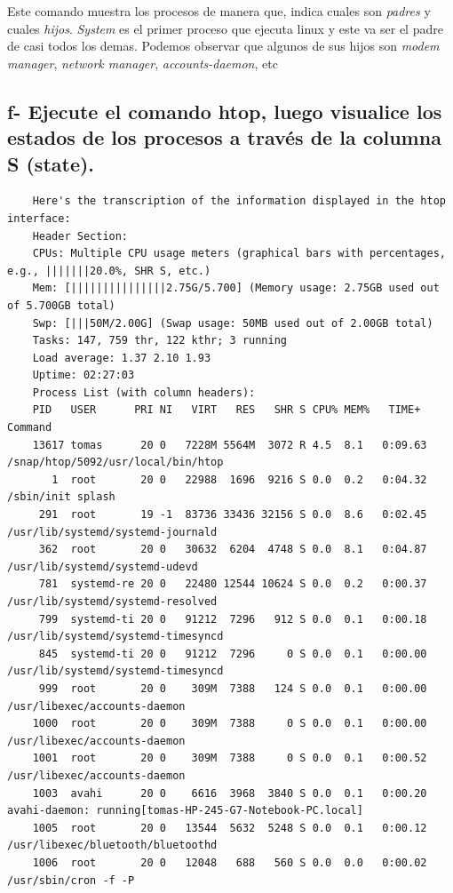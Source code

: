\documentclass{article}
\begin{document}
\noindent
Este comando muestra los procesos de manera que, indica cuales son \textit{padres} y cuales \textit{hijos}.
\textit{System} es el primer proceso que ejecuta linux y este va ser el padre de casi todos los demas.
Podemos observar que algunos de sus hijos son \textit{modem manager}, \textit{network manager}, \textit{accounts-daemon}, etc
\subsection*{f- Ejecute el comando htop, luego visualice los estados de los procesos a través de la columna S (state).}


\begin{commandline}
  {\scriptsize
    \begin{verbatim}
    Here's the transcription of the information displayed in the htop interface:
    Header Section:
    CPUs: Multiple CPU usage meters (graphical bars with percentages, e.g., |||||||20.0%, SHR S, etc.)
    Mem: [|||||||||||||||2.75G/5.700] (Memory usage: 2.75GB used out of 5.700GB total)
    Swp: [|||50M/2.00G] (Swap usage: 50MB used out of 2.00GB total)
    Tasks: 147, 759 thr, 122 kthr; 3 running
    Load average: 1.37 2.10 1.93
    Uptime: 02:27:03
    Process List (with column headers):
    PID   USER      PRI NI   VIRT   RES   SHR S CPU% MEM%   TIME+  Command
    13617 tomas      20 0   7228M 5564M  3072 R 4.5  8.1   0:09.63 /snap/htop/5092/usr/local/bin/htop
       1  root       20 0   22988  1696  9216 S 0.0  0.2   0:04.32 /sbin/init splash
     291  root       19 -1  83736 33436 32156 S 0.0  8.6   0:02.45 /usr/lib/systemd/systemd-journald
     362  root       20 0   30632  6204  4748 S 0.0  8.1   0:04.87 /usr/lib/systemd/systemd-udevd
     781  systemd-re 20 0   22480 12544 10624 S 0.0  0.2   0:00.37 /usr/lib/systemd/systemd-resolved
     799  systemd-ti 20 0   91212  7296   912 S 0.0  0.1   0:00.18 /usr/lib/systemd/systemd-timesyncd
     845  systemd-ti 20 0   91212  7296     0 S 0.0  0.1   0:00.00 /usr/lib/systemd/systemd-timesyncd
     999  root       20 0    309M  7388   124 S 0.0  0.1   0:00.00 /usr/libexec/accounts-daemon
    1000  root       20 0    309M  7388     0 S 0.0  0.1   0:00.00 /usr/libexec/accounts-daemon
    1001  root       20 0    309M  7388     0 S 0.0  0.1   0:00.52 /usr/libexec/accounts-daemon
    1003  avahi      20 0    6616  3968  3840 S 0.0  0.1   0:00.20 avahi-daemon: running[tomas-HP-245-G7-Notebook-PC.local]
    1005  root       20 0   13544  5632  5248 S 0.0  0.1   0:00.12 /usr/libexec/bluetooth/bluetoothd
    1006  root       20 0   12048   688   560 S 0.0  0.0   0:00.02 /usr/sbin/cron -f -P

\end{verbatim}}
\end{commandline}
\end{document}
